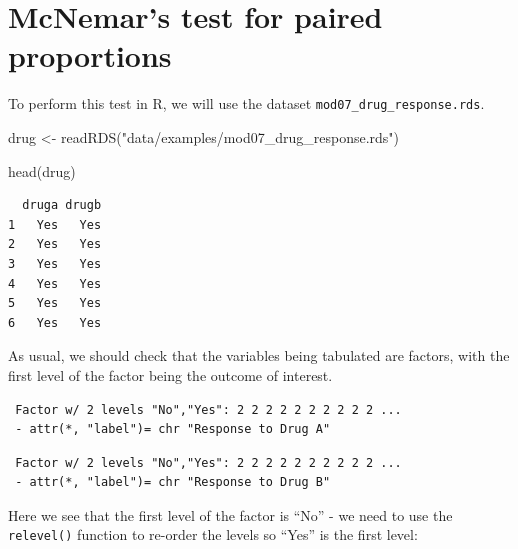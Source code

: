 \documentclass[
  a4paper,
]{memoir}
\newenvironment{Shaded}{\begin{snugshade}}{\end{snugshade}}
\newcommand{\FunctionTok}[1]{\textcolor[rgb]{0.00,0.00,0.00}{#1}}
\newcommand{\NormalTok}[1]{\textcolor[rgb]{0.00,0.00,0.00}{#1}}
\newcommand{\OtherTok}[1]{\textcolor[rgb]{0.00,0.00,0.00}{#1}}
\newcommand{\SpecialCharTok}[1]{\textcolor[rgb]{0.00,0.00,0.00}{#1}}
\newcommand{\StringTok}[1]{\textcolor[rgb]{0.00,0.00,0.00}{#1}}
\begin{document}
\section{McNemar's test for paired
proportions}\label{mcnemars-test-for-paired-proportions-1}

To perform this test in R, we will use the dataset
\texttt{mod07\_drug\_response.rds}.

\begin{Shaded}
\begin{Highlighting}[]
\NormalTok{drug }\OtherTok{\textless{}{-}} \FunctionTok{readRDS}\NormalTok{(}\StringTok{"data/examples/mod07\_drug\_response.rds"}\NormalTok{)}

\FunctionTok{head}\NormalTok{(drug)}
\end{Highlighting}
\end{Shaded}

\begin{verbatim}
  druga drugb
1   Yes   Yes
2   Yes   Yes
3   Yes   Yes
4   Yes   Yes
5   Yes   Yes
6   Yes   Yes
\end{verbatim}

As usual, we should check that the variables being tabulated are
factors, with the first level of the factor being the outcome of
interest.

\begin{Shaded}
\end{Shaded}

\begin{verbatim}
 Factor w/ 2 levels "No","Yes": 2 2 2 2 2 2 2 2 2 2 ...
 - attr(*, "label")= chr "Response to Drug A"
\end{verbatim}

\begin{Shaded}
\end{Shaded}

\begin{verbatim}
 Factor w/ 2 levels "No","Yes": 2 2 2 2 2 2 2 2 2 2 ...
 - attr(*, "label")= chr "Response to Drug B"
\end{verbatim}

Here we see that the first level of the factor is ``No'' - we need to
use the \texttt{relevel()} function to re-order the levels so ``Yes'' is
the first level:
\end{document}
